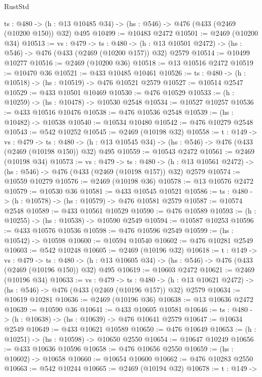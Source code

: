 \begin{lexlean}{RustStd}
\begin{coremodule}
  {ts : @480} -> (h : @13 @10485 @34) -> (hs : @546) -> @476 (@433 (@2469 (@10200 @150)) @32) @495
@10499 := @10483 @2472
@10501 := @2469 (@10200 @34)
@10513 := {vs : @479} ->
  {ts : @480} ->
  (h : @13 @10501 @2472) -> (hs : @546) -> @476 (@433 (@2469 (@10200 @157)) @32) @2579
@10514 := @10499 @10277
@10516 := @2469 (@10200 @36)
@10518 := @13 @10516 @2472
@10519 := @10470 @36
@10521 := @433 @10485 @10461
@10526 := {ts : @480} -> (h : @10518) -> (hs : @10519) -> @476 @10521 @2579
@10527 := @10514 @2547
@10529 := @433 @10501 @10469
@10530 := @476 @10529
@10533 := (h : @10259) -> (hs : @10478) -> @10530 @2548
@10534 := @10527 @10257
@10536 := @433 @10516 @10476
@10538 := @476 @10536 @2548
@10539 := (hs : @10482) -> @10538
@10540 := @10534 @10480
@10542 := @476 @10279 @2548
@10543 := @542 @10252
@10545 := @2469 (@10198 @32)
@10558 := {t : @149} ->
  {vs : @479} ->
  {ts : @480} -> (h : @13 @10545 @34) -> (hs : @546) -> @476 (@433 (@2469 (@10198 @150)) @32) @495
@10559 := @10543 @2472
@10561 := @2469 (@10198 @34)
@10573 := {vs : @479} ->
  {ts : @480} ->
  (h : @13 @10561 @2472) -> (hs : @546) -> @476 (@433 (@2469 (@10198 @157)) @32) @2579
@10574 := @10559 @10279
@10576 := @2469 (@10198 @36)
@10578 := @13 @10576 @2472
@10579 := @10530 @36
@10581 := @433 @10545 @10521
@10586 := {ts : @480} -> (h : @10578) -> (hs : @10579) -> @476 @10581 @2579
@10587 := @10574 @2548
@10589 := @433 @10561 @10529
@10590 := @476 @10589
@10593 := (h : @10255) -> (hs : @10538) -> @10590 @2549
@10594 := @10587 @10253
@10596 := @433 @10576 @10536
@10598 := @476 @10596 @2549
@10599 := (hs : @10542) -> @10598
@10600 := @10594 @10540
@10602 := @476 @10281 @2549
@10603 := @542 @10248
@10605 := @2469 (@10196 @32)
@10618 := {t : @149} ->
  {vs : @479} ->
  {ts : @480} -> (h : @13 @10605 @34) -> (hs : @546) -> @476 (@433 (@2469 (@10196 @150)) @32) @495
@10619 := @10603 @2472
@10621 := @2469 (@10196 @34)
@10633 := {vs : @479} ->
  {ts : @480} ->
  (h : @13 @10621 @2472) -> (hs : @546) -> @476 (@433 (@2469 (@10196 @157)) @32) @2579
@10634 := @10619 @10281
@10636 := @2469 (@10196 @36)
@10638 := @13 @10636 @2472
@10639 := @10590 @36
@10641 := @433 @10605 @10581
@10646 := {ts : @480} -> (h : @10638) -> (hs : @10639) -> @476 @10641 @2579
@10647 := @10634 @2549
@10649 := @433 @10621 @10589
@10650 := @476 @10649
@10653 := (h : @10251) -> (hs : @10598) -> @10650 @2550
@10654 := @10647 @10249
@10656 := @433 @10636 @10596
@10658 := @476 @10656 @2550
@10659 := (hs : @10602) -> @10658
@10660 := @10654 @10600
@10662 := @476 @10283 @2550
@10663 := @542 @10244
@10665 := @2469 (@10194 @32)
@10678 := {t : @149} ->

\end{coremodule}
\end{lexlean}
